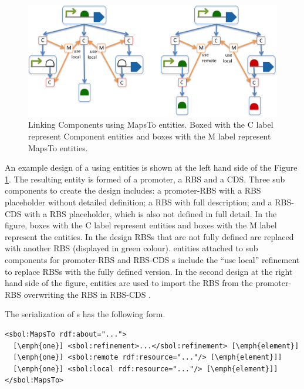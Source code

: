 \begin{figure}[ht]
\begin{center}
\includegraphics[scale=1]{images/MapsTo_Diagram2}
\caption{Linking Components using MapsTo entities. Boxed with the C label represent Component entities and boxes with the M label represent MapsTo entities.}
\label{image:maps_to_diagram2}
\end{center}
\end{figure}

An example design of a  using  entities is shown at the left hand side of the Figure \ref{image:maps_to_diagram2}. The resulting entity is formed of a promoter, a RBS and a CDS. Three sub components to create the design includes: a promoter-RBS  with a RBS placeholder without detailed definition; a RBS  with full description; and a RBS-CDS  with a RBS placeholder, which is also not defined in full detail. In the figure, boxes with the C label represent  entities and boxes with the M label represent the  entities. In the design RBSs that are not fully defined are replaced with another RBS  (displayed in green colour).  entities attached to sub components for promoter-RBS and RBS-CDS s include the ``use local'' refinement to replace RBSs with the fully defined version. In the second design at the right hand side of the figure,  entities are used to import the RBS from the promoter-RBS  overwriting the RBS in RBS-CDS . 

The serialization of s has the following form.
\begin{lstlisting}
<sbol:MapsTo rdf:about="...">
  [\emph{one}] <sbol:refinement>...</sbol:refinement> [\emph{element}]
  [\emph{one}] <sbol:remote rdf:resource="..."/> [\emph{element}]]
  [\emph{one}] <sbol:local rdf:resource="..."/> [\emph{element}]]
</sbol:MapsTo>
\end{lstlisting}


